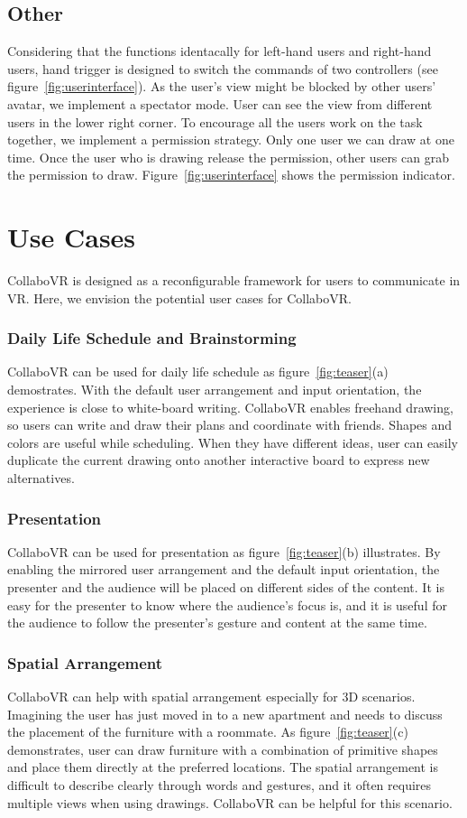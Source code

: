 \documentclass{sigchi}
\begin{document}
\subsection{Other}
Considering that the functions identacally for left-hand users and right-hand users, hand trigger is designed to switch the commands of two controllers (see figure~\ref{fig:userinterface}). As the user's view might be blocked by other users' avatar, we implement a spectator mode. User can see the view from different users in the lower right corner. To encourage all the users work on the task together, we implement a permission strategy. Only one user we can draw at one time. Once the user who is drawing release the permission, other users can grab the permission to draw. Figure~\ref{fig:userinterface} shows the permission indicator.

\section{Use Cases}
CollaboVR is designed as a reconfigurable framework for users to communicate in VR. Here, we envision the potential user cases for CollaboVR.

\subsubsection{Daily Life Schedule and Brainstorming}
CollaboVR can be used for daily life schedule as figure~\ref{fig:teaser}(a) demostrates. With the default user arrangement and input orientation, the experience is close to white-board writing. CollaboVR enables freehand drawing, so users can write and draw their plans and coordinate with friends. Shapes and colors are useful while scheduling. When they have different ideas, user can easily duplicate the current drawing onto another interactive board to express new alternatives.

\subsubsection{Presentation}
CollaboVR can be used for presentation as figure~\ref{fig:teaser}(b) illustrates. By enabling the mirrored user arrangement and the default input orientation, the presenter and the audience will be placed on different sides of the content. It is easy for the presenter to know where the audience's focus is, and it is useful for the audience to follow the presenter's gesture and content at the same time.

\subsubsection{Spatial Arrangement}
CollaboVR can help with spatial arrangement especially for 3D scenarios. Imagining the user has just moved in to a new apartment and needs to discuss the placement of the furniture with a roommate. As figure~\ref{fig:teaser}(c) demonstrates, user can draw furniture with a combination of primitive shapes and place them directly at the preferred locations. The spatial arrangement is difficult to describe clearly through words and gestures, and it often requires multiple views when using drawings. CollaboVR can be helpful for this scenario.
\end{document}
